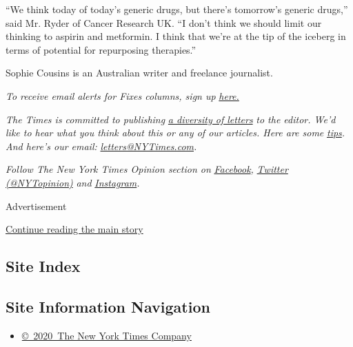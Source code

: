 ``We think today of today's generic drugs, but there's tomorrow's
generic drugs,'' said Mr. Ryder of Cancer Research UK. ``I don't think
we should limit our thinking to aspirin and metformin. I think that
we're at the tip of the iceberg in terms of potential for repurposing
therapies.''

Sophie Cousins is an Australian writer and freelance journalist.

\emph{To receive email alerts for Fixes columns, sign up}
\href{http://eepurl.com/ABIxL}{\emph{here.}}

\emph{The Times is committed to publishing}
\href{https://www.nytimes3xbfgragh.onion/2019/01/31/opinion/letters/letters-to-editor-new-york-times-women.html}{\emph{a
diversity of letters}} \emph{to the editor. We'd like to hear what you
think about this or any of our articles. Here are some}
\href{https://help.nytimes3xbfgragh.onion/hc/en-us/articles/115014925288-How-to-submit-a-letter-to-the-editor}{\emph{tips}}\emph{.
And here's our email:}
\href{mailto:letters@NYTimes.com}{\emph{letters@NYTimes.com}}\emph{.}

\emph{Follow The New York Times Opinion section on}
\href{https://www.facebookcorewwwi.onion/nytopinion}{\emph{Facebook}}\emph{,}
\href{http://twitter.com/NYTOpinion}{\emph{Twitter (@NYTopinion)}}
\emph{and}
\href{https://www.instagram.com/nytopinion/}{\emph{Instagram}}\emph{.}

Advertisement

\protect\hyperlink{after-bottom}{Continue reading the main story}

\hypertarget{site-index}{%
\subsection{Site Index}\label{site-index}}

\hypertarget{site-information-navigation}{%
\subsection{Site Information
Navigation}\label{site-information-navigation}}

\begin{itemize}
\tightlist
\item
  \href{https://help.nytimes3xbfgragh.onion/hc/en-us/articles/115014792127-Copyright-notice}{©~2020~The
  New York Times Company}
\end{itemize}

